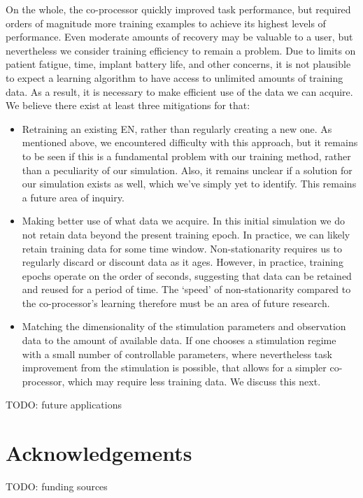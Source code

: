 \documentclass[12pt]{iopart}
\begin{document}
On the whole, the co-processor quickly improved task performance, but required orders of
magnitude more training examples to achieve its highest levels of performance. Even
moderate amounts of recovery may be valuable to a user, but nevertheless we consider
training efficiency to remain a problem. Due to limits on patient fatigue, time, implant
battery life, and other concerns, it is not plausible to expect a learning algorithm
to have access to unlimited amounts of training data. As a result, it is necessary to
make efficient use of the data we can acquire. We believe there exist at least three
mitigations for that:

\begin{itemize}
	\item Retraining an existing EN, rather than regularly creating a new one. As
	      mentioned above, we encountered difficulty with this approach, but it remains
	      to be seen if this is a fundamental problem with our training method, rather
	      than a peculiarity of our simulation. Also, it remains unclear if a solution
	      for our simulation exists as well, which we've simply yet to identify. This
	      remains a future area of inquiry.
	\item Making better use of what data we acquire. In this initial simulation we do
	      not retain data beyond the present training epoch. In practice, we can likely
	      retain training data for some time window. Non-stationarity requires us to
	      regularly discard or discount data as it ages. However, in practice, training
	      epochs operate on the order of seconds, suggesting that data can be retained
	      and reused for a period of time. The `speed' of non-stationarity compared to
	      the co-processor's learning therefore must be an area of future research.
	\item Matching the dimensionality of the stimulation parameters and observation
	      data to the amount of available data. If one chooses a stimulation regime with
	      a small number of controllable parameters, where nevertheless task improvement
	      from the stimulation is possible, that allows for a simpler co-processor, which
	      may require less training data. We discuss this next.
\end{itemize}

TODO: future applications

\section{Acknowledgements}
TODO: funding sources
\end{document}
